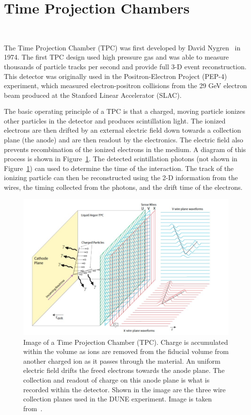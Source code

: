 \section{Time Projection Chambers}~\label{sec:tpcs}

The Time Projection Chamber (TPC) was first developed by David Nygren~\cite{lartpc:nygren} in 1974.
The first TPC design used high pressure gas and was able to measure thousands of particle tracks per second and provide full 3-D event reconstruction.
This detector was originally used in the Positron-Electron Project (PEP-4) experiment, which measured electron-positron collisions from the 29 GeV electron beam produced at the Stanford Linear Accelerator (SLAC).

The basic operating principle of a TPC is that a charged, moving particle ionizes other particles in the detector and produces scintillation light.
The ionized electrons are then drifted by an external electric field down towards a collection plane (the anode) and are then readout by the electronics.
The electric field also prevents recombination of the ionized electrons in the medium. 
A diagram of this process is shown in Figure~\ref{fig:dune_apa}.
The detected scintillation photons (not shown in Figure~\ref{fig:dune_apa}) can used to determine the time of the interaction.
The track of the ionizing particle can then be reconstructed using the 2-D information from the wires, the timing collected from the photons, and the drift time of the electrons.

\begin{figure}[]
\centering
\includegraphics[width=\textwidth]{images/dune_tdrv12020_lartpc-sp.jpg}
\caption{Image of a Time Projection Chamber (TPC).
Charge is accumulated within the volume as ions are removed from the fiducial volume from another charged ion as it passes through the material.
An uniform electric field drifts the freed electrons towards the anode plane.
The collection and readout of charge on this anode plane is what is recorded within the detector.
Shown in the image are the three wire collection planes used in the DUNE experiment.
Image is taken from~\citep{DUNE_TDR_V1_Abi_2020}.}
\label{fig:dune_apa}
\end{figure}

